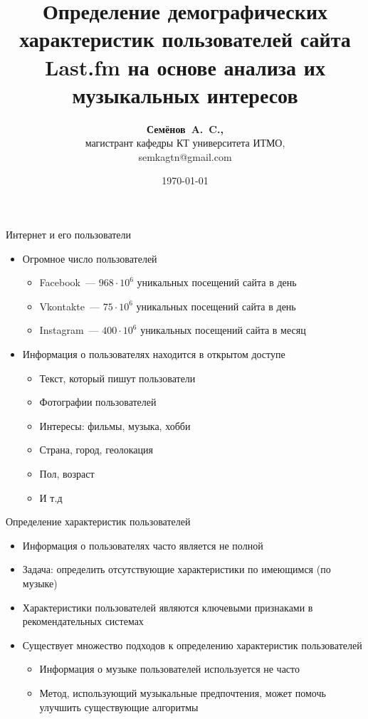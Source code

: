 \documentclass{beamer}
\title{Определение демографических характеристик пользователей
сайта Last.fm на основе анализа их музыкальных интересов}
\author{\textbf{Семёнов~A.~C.,} \\ 
    магистрант кафедры КТ университета ИТМО, \\
    semkagtn@gmail.com}
\institute{СПИСОК 2016}
\date{\today}
\begin{document}
\begin{frame}
  \titlepage
\end{frame}

\begin{frame}{Интернет и его пользователи}
  \begin{itemize}
      \item {Огромное число пользователей}
          \begin{itemize}
              \item {Facebook~--- $968 \cdot 10^{6}$ уникальных посещений сайта в день}
              \item {Vkontakte~--- $75 \cdot 10^{6}$ уникальных посещений сайта в день}
              \item {Instagram~--- $400 \cdot 10^{6}$ уникальных посещений сайта в месяц}
          \end{itemize}
      \item {Информация о пользователях находится в открытом доступе}
          \begin{itemize}
              \item {Текст, который пишут пользователи}
              \item {Фотографии пользователей}
              \item {Интересы: фильмы, музыка, хобби}
              \item {Страна, город, геолокация}
              \item {Пол, возраст}
              \item {И т.д}
          \end{itemize}
  \end{itemize}
\end{frame}

\begin{frame}{Определение характеристик пользователей}
  \begin{itemize}
      \item {Информация о пользователях часто является не полной}
      \item {Задача: определить отсутствующие характеристики по имеющимся (по музыке)}
      \item {Характеристики пользователей являются ключевыми признаками в рекомендательных системах}
      \item {Существует множество подходов к определению характеристик пользователей}
          \begin{itemize}
              \item {Информация о музыке пользователей используется не часто}
              \item {Метод, использующий музыкальные предпочтения, может помочь улучшить существующие алгоритмы}
          \end{itemize}
  \end{itemize}
\end{frame}
\end{document}
